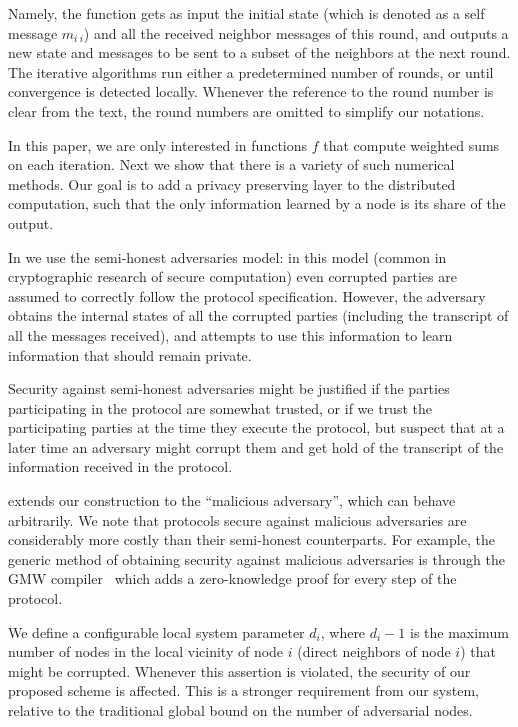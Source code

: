 \documentclass[10pt]{svjour3}
\begin{document}
Namely, the function gets as input the initial state (which is
denoted as a self message $m_{i~i}$) and all the received neighbor
messages of this round, and outputs a new state and messages to be
sent to a subset of the neighbors at the next round. The iterative
algorithms run either a predetermined number of rounds, or until
convergence is detected locally. Whenever the reference to the
round number is clear from the text, the round numbers are omitted
to simplify our notations.

In this paper, we are only interested in functions $f$ that
compute weighted sums on each iteration. Next we show that there
is a variety of such numerical methods. Our goal is to add a
privacy preserving layer to the distributed computation, such that
the only information learned by a node is its share of the output.

In  we use the semi-honest adversaries model: in this model (common in
cryptographic research of secure computation) even corrupted parties
are assumed to correctly follow the protocol specification. However,
the adversary obtains the internal states of all the corrupted parties
(including the transcript of all the messages received), and attempts
to use this information to learn information that should remain
private.

Security against semi-honest adversaries might be
 justified if the parties participating in the protocol are somewhat
 trusted, or if we trust the participating parties at the time they
 execute the protocol, but suspect that at a later time an adversary
 might corrupt them and get hold of the transcript of the information
 received in the protocol.

 extends our construction to the ``malicious adversary'',
which can behave arbitrarily.  We note that protocols secure against malicious adversaries are
 considerably more costly than their semi-honest counterparts. For
 example, the generic method of obtaining security against malicious
  adversaries is through the GMW compiler~\cite{GMW} which adds a
  zero-knowledge proof for every step of the protocol.




We define a configurable local system parameter $d_i$, where $d_i-1$ is  the
maximum number of nodes in the local vicinity of node $i$
(direct neighbors of node $i$) that might be corrupted. Whenever this
assertion is violated, the security of our proposed scheme is
affected. This is a stronger requirement from our system, relative
to the traditional global bound on the number of adversarial
nodes.
\end{document}
